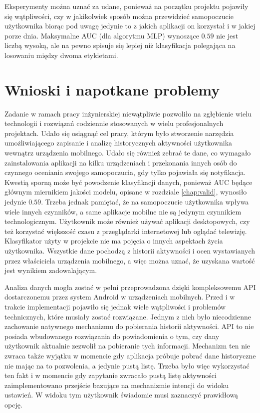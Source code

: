 \documentclass[a4paper,twoside,12pt]{book}
\begin{document}
Eksperymenty można uznać za udane, ponieważ na początku projektu pojawiły się wątpliwości, czy w jakikolwiek sposób można przewidzieć samopoczucie użytkownika biorąc pod uwagę jedynie to z jakich aplikacji on korzystał i w jakiej porze dnia. Maksymalne AUC (dla algorytmu MLP) wynoszące $0.59$ nie jest liczbą wysoką, ale na pewno spisuje się lepiej niż klasyfikacja polegająca na losowaniu między dwoma etykietami.  


\chapter{Wnioski i napotkane problemy}
\label{chap:conc}
Zadanie w ramach pracy inżynierskiej niewątpliwie pozwoliło na zgłębienie wielu technologii i rozwiązań codziennie stosowanych w wielu profesjonalnych projektach. Udało się osiągnąć cel pracy, którym było stworzenie narzędzia umożliwiającego zapisanie i analizę historycznych aktywności użytkownika wewnątrz urządzenia mobilnego. Udało się również zebrać te dane, co wymagało zainstalowania aplikacji na kilku urządzeniach i przekonania innych osób do czynnego oceniania swojego samopoczucia, gdy tylko pojawiała się notyfikacja. Kwestią sporną może być powodzenie klasyfikacji danych, ponieważ AUC będące głównym miernikiem jakości modelu, opisane w rozdziale \ref{chap:valid}, wynosiło jedynie $0.59$. Trzeba jednak pamiętać, że na samopoczucie użytkownika wpływa wiele innych czynników, a same aplikacje mobilne nie są jedynym czynnikiem technologicznym. Użytkownik może również używać aplikacji desktopowych, czy też korzystać większość czasu z przeglądarki internetowej lub oglądać telewizję. Klasyfikator użyty w projekcie nie ma pojęcia o innych aspektach życia użytkownika. Wszystkie dane pochodzą z historii aktywności i ocen wystawianych przez właściciela urządzenia mobilnego, a więc można uznać, że uzyskana wartość jest wynikiem zadowalającym.

Analiza danych mogła zostać w pełni przeprowadzona dzięki kompleksowemu API dostarczonemu przez system Android w urządzeniach mobilnych. Przed i w trakcie implementacji pojawiło się jednak wiele wątpliwości i problemów technicznych, które musiały zostać rozwiązane. Jednym z nich było niecodzienne zachowanie natywnego mechanizmu do pobierania historii aktywności. API to nie posiada wbudowanego rozwiązania do powiadomienia o tym, czy dany użytkownik aktualnie zezwolił na pobieranie tych informacji. Mechanizm ten nie zwraca także wyjątku w momencie gdy aplikacja próbuje pobrać dane historyczne nie mając na to pozwolenia, a jedynie pustą listę. Trzeba było więc wykorzystać ten fakt i w momencie gdy zapytanie zwracało pustą listę aktywności zaimplementowano przejście bazujące na mechanizmie intencji do widoku ustawień. W widoku tym użytkownik świadomie musi zaznaczyć prawidłową opcję. 
\end{document}
